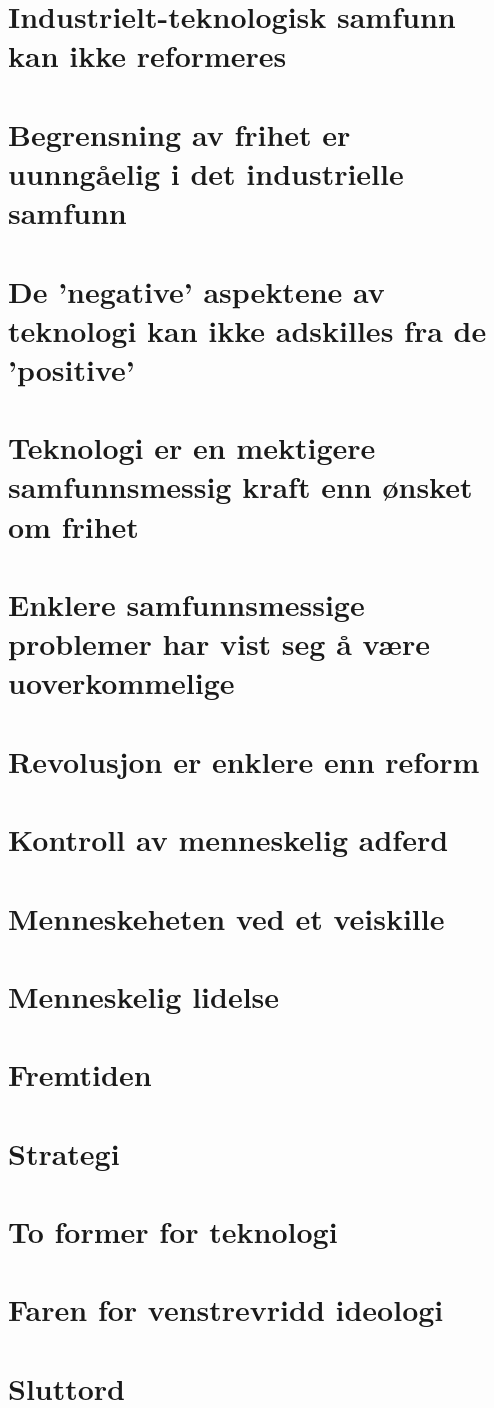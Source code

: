 \documentclass[oneside]{book}
\begin{document}
\chapter{Industrielt-teknologisk samfunn kan ikke reformeres}

\chapter{Begrensning av frihet er uunngåelig i det industrielle samfunn}

\chapter{De 'negative' aspektene av teknologi kan ikke adskilles fra de 'positive'}

\chapter{Teknologi er en mektigere samfunnsmessig kraft enn ønsket om frihet}

\chapter{Enklere samfunnsmessige problemer har vist seg å være uoverkommelige}

\chapter{Revolusjon er enklere enn reform}

\chapter{Kontroll av menneskelig adferd}

\chapter{Menneskeheten ved et veiskille}

\chapter{Menneskelig lidelse}

\chapter{Fremtiden}

\chapter{Strategi}

\chapter{To former for teknologi}

\chapter{Faren for venstrevridd ideologi}

\chapter{Sluttord}
\end{document}
